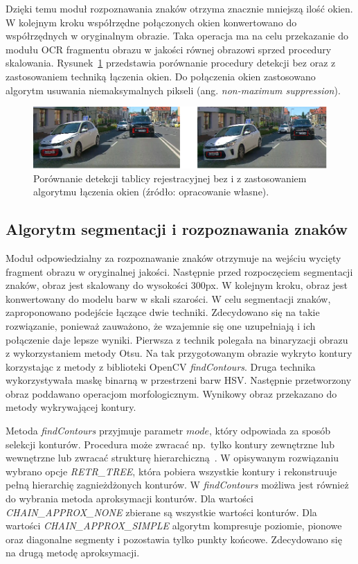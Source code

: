 Dzięki temu moduł rozpoznawania znaków otrzyma znacznie mniejszą ilość okien.
W kolejnym kroku współrzędne połączonych okien konwertowano do współrzędnych w oryginalnym obrazie.
Taka operacja ma na celu przekazanie do modułu OCR fragmentu obrazu w jakości równej obrazowi sprzed procedury skalowania.
Rysunek~\ref{fig:non_max_supression} przedstawia porównanie procedury detekcji bez oraz z zastosowaniem techniką łączenia okien.
Do połączenia okien zastosowano algorytm usuwania niemaksymalnych pikseli (ang. \textit{non-maximum suppression}).
\begin{figure}[!ht]
    \centering
    \includegraphics[scale=0.4]{Pictures/non_max_supression}
    \caption{Porównanie detekcji tablicy rejestracyjnej bez i z zastosowaniem algorytmu łączenia okien (źródło: opracowanie własne).}
    \label{fig:non_max_supression}
\end{figure}
\FloatBarrier

\subsection{Algorytm segmentacji i rozpoznawania znaków}
Moduł odpowiedzialny za rozpoznawanie znaków otrzymuje na wejściu wycięty fragment obrazu w oryginalnej jakości.
Następnie przed rozpoczęciem segmentacji znaków, obraz jest skalowany do wysokości 300px.
W kolejnym kroku, obraz jest konwertowany do modelu barw w skali szarości.
W celu segmentacji znaków, zaproponowano podejście łączące dwie techniki.
Zdecydowano się na takie rozwiązanie, ponieważ zauważono, że wzajemnie się one uzupełniają i ich połączenie daje lepsze wyniki.
Pierwsza z technik polegała na binaryzacji obrazu z wykorzystaniem metody Otsu.
Na tak przygotowanym obrazie wykryto kontury korzystając z metody z biblioteki OpenCV \textit{findContours}.
Druga technika wykorzystywała maskę binarną w przestrzeni barw HSV\@.
Następnie przetworzony obraz poddawano operacjom morfologicznym.
Wynikowy obraz przekazano do metody wykrywającej kontury.

Metoda \textit{findContours} przyjmuje parametr $mode$, który odpowiada za sposób selekcji konturów.
Procedura może zwracać np.\ tylko kontury zewnętrzne lub wewnętrzne lub zwracać strukturę hierarchiczną~\cite{open_cv_contours_mode}.
W opisywanym rozwiązaniu wybrano opcje \textit{RETR\_TREE}, która pobiera wszystkie kontury i rekonstruuje pełną hierarchię zagnieżdżonych konturów.
W \textit{findContours} możliwa jest również do wybrania metoda aproksymacji konturów.
Dla wartości \textit{CHAIN\_APPROX\_NONE} zbierane są wszystkie wartości konturów.
Dla wartości \textit{CHAIN\_APPROX\_SIMPLE} algorytm kompresuje poziomie, pionowe oraz diagonalne segmenty i pozostawia tylko punkty końcowe.
Zdecydowano się na drugą metodę aproksymacji.

